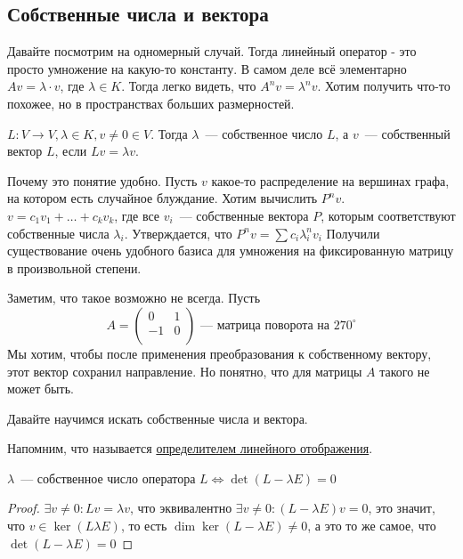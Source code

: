 \subsection{Собственные числа и вектора}
\begin{motivation}
    Давайте посмотрим на одномерный случай. Тогда линейный оператор - это просто умножение на какую-то константу. В самом деле всё элементарно $Av = \lambda\cdot v$, где $\lambda\in K$.
    Тогда легко видеть, что $A^nv = \lambda^n v$. Хотим получить что-то похожее, но в пространствах больших размерностей.
\end{motivation}
\begin{definition}
    $L\colon V\rightarrow V, \lambda\in K, v\not= 0\in V$. Тогда $\lambda$~--- собственное число $L$, а $v$~--- собственный вектор $L$,
    если $Lv = \lambda v$.
\end{definition}
\begin{motivation}
    Почему это понятие удобно. Пусть $v$ какое-то распределение на вершинах графа, на котором есть случайное блуждание.
    Хотим вычислить $P^n v$. $v = c_1v_1 + \dots + c_kv_k$, где все $v_i$~--- собственные вектора $P$, которым соответствуют собственные числа $\lambda_i$. Утверждается, что $P^n v = \sum c_i \lambda_i^n v_i$
    Получили существование очень удобного базиса для умножения на фиксированную матрицу в произвольной степени.
\end{motivation}
\begin{remark}
    Заметим, что такое возможно не всегда.
    Пусть 
    \[
    A = 
    \begin{pmatrix}
        0& 1\\
        -1&0\\
    \end{pmatrix}
    \text{~--- матрица поворота на~} 270^\circ 
    \]
    Мы хотим, чтобы после применения преобразования к собственному вектору, этот вектор сохранил направление.
    Но понятно, что для матрицы $A$ такого не может быть.
\end{remark}
\begin{motivation}
    Давайте научимся искать собственные числа и вектора.
\end{motivation}
\begin{remark}
    Напомним, что называется \hyperref[def:определитель отображения]{определителем линейного отображения}.
\end{remark}
\begin{statement}
    $\lambda$~--- собственное число оператора $L \Leftrightarrow \det(L - \lambda E) = 0$
\end{statement}
\begin{proof}
    $\exists v\not= 0\colon Lv = \lambda v$, что эквивалентно $\exists v\not=0\colon (L - \lambda E)v = 0$,
    это значит, что $v \in \ker (L \lambda E)$, то есть $\dim \ker (L - \lambda E) \neq 0$, а это то же самое, что $\det(L - \lambda E) = 0$
\end{proof}
